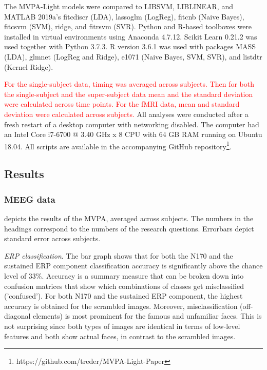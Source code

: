 \documentclass[utf8]{frontiersSCNS} %
\newcommand{\red}[1]{\textcolor{red}{#1}}
\begin{document}
The MVPA-Light models were compared to LIBSVM,  LIBLINEAR, and MATLAB 2019a's fitcdiscr (LDA), lassoglm (LogReg), fitcnb (Naive Bayes), fitcsvm (SVM), ridge, and fitrsvm (SVR). Python and R-based toolboxes were installed in virtual environments using Anaconda 4.7.12. Scikit Learn 0.21.2 was used together with Python 3.7.3. R version 3.6.1 was used with packages MASS (LDA), glmnet (LogReg and Ridge), e1071 (Naive Bayes, SVM, SVR), and listdtr (Kernel Ridge).

\red{For the single-subject data, timing was averaged across subjects. Then for both the single-subject and the super-subject data mean and the standard deviation were calculated across time points. For the fMRI data, mean and standard deviation were calculated across subjects.} All analyses were conducted after a fresh restart of a desktop computer with networking disabled. The computer had an Intel Core i7-6700 @ 3.40 GHz x 8 CPU with 64 GB RAM running on Ubuntu 18.04. All scripts are available in the accompanying GitHub repository\footnote{https://github.com/treder/MVPA-Light-Paper}.

\subsection{Results}

\subsubsection{MEEG data}
 depicts the results of the MVPA, averaged across subjects. The numbers in the headings correspond to the numbers of the research questions. Errorbars depict standard error across subjects.

\textit{ERP classification}. The bar graph shows that for both the N170 and the sustained ERP component classification accuracy is significantly above the chance level of 33\%. Accuracy is a summary measure that can be broken down into confusion matrices that show which combinations of classes get misclassified ('confused'). For both N170 and the sustained ERP component, the highest accuracy is obtained for the scrambled images. Moreover,  misclassification (off-diagonal elements) is most prominent for the famous and unfamiliar faces. This is not surprising since both types of images are identical in terms of low-level features and both show actual faces, in contrast to the scrambled images.
\end{document}
